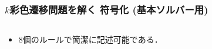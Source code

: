 \documentclass[dvipdfmx,11pt]{beamer}
\begin{document}
\begin{frame}[shrink]
  \frametitle{$k$彩色遷移問題を解く 符号化 {\small(基本ソルバー用)}}

\begin{columns}[t]
\begin{column}{0.95\linewidth}
\begin{exampleblock}{}
 
\end{exampleblock}    
\end{column}
\end{columns}

\bigskip
\begin{itemize}
  \item 8個のルールで簡潔に記述可能である．
\end{itemize}

\end{frame}
\end{document}
